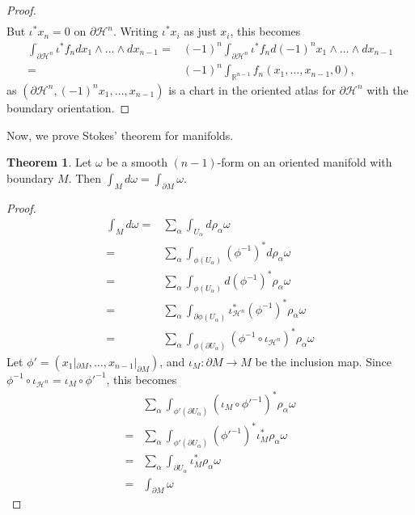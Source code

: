 \documentclass[]{article}
\theoremstyle{definition}
\newtheorem{theorem}{Theorem}[section] %
\theoremstyle{definition}
\begin{document}
\begin{proof}
\begin{align*}
    \end{align*}
    But $\iota^*x_n=0$ on $\partial \mathcal{H}^n$. Writing $\iota^*x_i$ as just $x_i$, this becomes \begin{align*}\int_{\partial \mathcal{H}^n}\iota^*f_n dx_1\wedge\dots\wedge dx_{n-1}=&(-1)^n\int_{\partial \mathcal{H}^n}\iota^*f_n d(-1)^nx_1\wedge\dots\wedge dx_{n-1}\\
        =&(-1)^n\int_{\mathbb{R}^{n-1}}f_n(x_1, \dots, x_{n-1}, 0),
    \end{align*} as $(\partial \mathcal{H}^n, (-1)^nx_1, \dots, x_{n-1})$ is a chart in the oriented atlas for $\partial \mathcal{H}^n$ with the boundary orientation.
\end{proof}

Now, we prove Stokes' theorem for manifolds.

\begin{theorem}
    Let $\omega$ be a smooth $(n-1)$-form on an oriented manifold with boundary $M$. Then $\int_{M}d\omega=\int_{\partial M}\omega$.
\end{theorem}

\begin{proof}
    \begin{align*}
        \int_M d\omega=&\sum_\alpha\int_{U_\alpha}d\rho_\alpha \omega\\
        =&\sum_\alpha\int_{\phi(U_\alpha)}(\phi^{-1})^*d\rho_\alpha \omega\\
        =&\sum_\alpha\int_{\phi(U_\alpha)}d(\phi^{-1})^*\rho_\alpha \omega\\
        =&\sum_\alpha\int_{\partial\phi(U_\alpha)}\iota_{\mathcal{H}^n}^*(\phi^{-1})^*\rho_\alpha \omega\\
        =&\sum_\alpha\int_{\phi(\partial U_\alpha)}(\phi^{-1}\circ\iota_{\mathcal{H}^n})^*\rho_\alpha \omega
    \end{align*}
    Let $\phi'=(x_1|_{\partial M}, \dots, x_{n-1}|_{\partial M})$, and $\iota_M:\partial M \rightarrow M$ be the inclusion map. Since $\phi^{-1}\circ\iota_{\mathcal{H}^n}=\iota_M\circ\phi'^{-1}$, this becomes \begin{align*}
        &\sum_\alpha\int_{\phi'(\partial U_\alpha)}(\iota_M\circ\phi'^{-1})^*\rho_\alpha \omega\\
        =&\sum_\alpha\int_{\phi'(\partial U_\alpha)}(\phi'^{-1})^*\iota_M^*\rho_\alpha \omega\\
        =&\sum_\alpha\int_{\partial U_\alpha}\iota_M^*\rho_\alpha \omega\\
        =&\int_{\partial M}\omega
    \end{align*}
\end{proof}
\end{document}
